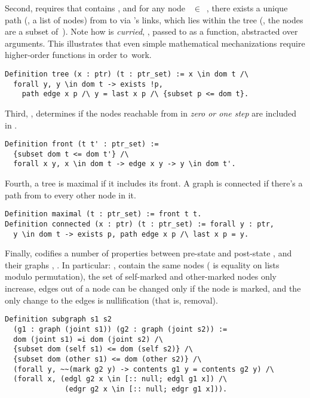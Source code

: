 Second,  requires that  contains , and
for any node ~$\in$~, there exists a unique path (\ie,
a list of nodes)  from  to  via 's
links, which lies within the tree (\ie, the nodes  are a subset
of~). Note how  is \emph{curried}, \ie, passed to
 as a function, abstracted over arguments. This illustrates
that even simple mathematical mechanizations require higher-order
functions in order to~work.
%
\begin{lstlisting}
Definition tree (x : ptr) (t : ptr_set) := x \in dom t /\
  forall y, y \in dom t -> exists !p, 
    path edge x p /\ y = last x p /\ {subset p <= dom t}.   
\end{lstlisting} 
%
%
Third, , determines if the nodes reachable from
\code{t} in \emph{zero or one step} are included in \code{t'}.
%
\begin{lstlisting}
Definition front (t t' : ptr_set) :=
  {subset dom t <= dom t'} /\
  forall x y, x \in dom t -> edge x y -> y \in dom t'. 
\end{lstlisting}
%
Fourth, a tree  is maximal if it includes its front. A graph
is connected if there's a path from  to every other node in it.
\begin{lstlisting}
Definition maximal (t : ptr_set) := front t t.
Definition connected (x : ptr) (t : ptr_set) := forall y : ptr, 
  y \in dom t -> exists p, path edge x p /\ last x p = y.
\end{lstlisting}
%
Finally,  codifies a number of properties between
pre-state  and post-state , and their graphs
\code{g1}, \code{g2}. In particular: \code{g1}, \code{g2} contain the
same nodes (\code{=i} is equality on lists modulo permutation), the
set of self-marked and other-marked nodes only increase, edges out of
a node \code{y} can be changed only if the node is marked, and the
only change to the edges is nullification (that is, removal).
\begin{lstlisting}
Definition subgraph s1 s2 
  (g1 : graph (joint s1)) (g2 : graph (joint s2)) :=
  dom (joint s1) =i dom (joint s2) /\
  {subset dom (self s1) <= dom (self s2)} /\
  {subset dom (other s1) <= dom (other s2)} /\
  (forall y, ~~(mark g2 y) -> contents g1 y = contents g2 y) /\
  (forall x, (edgl g2 x \in [:: null; edgl g1 x]) /\
              (edgr g2 x \in [:: null; edgr g1 x])).
\end{lstlisting}

